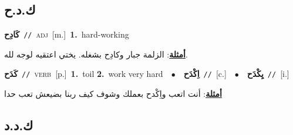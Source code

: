 \documentclass[10pt,a4paper,twoside]{article} %
\begin{document}
\begin{multicols}{2}
\vspace{-3mm}
\subsection*{\color{blue}\foreignlanguage{arabic}{ك.د.ح}\color{blue}{}} 

{\setlength\topsep{0pt}\textbf{\foreignlanguage{arabic}{كَادِح}}\ {\color{gray}\texttt{//}\color{black}}\ \textsc{adj}\ [m.]\ \textbf{1.}~hard-working\  \begin{flushright}\color{gray}\foreignlanguage{arabic}{\textbf{\underline{\foreignlanguage{arabic}{أمثلة}}}: الزلمة جبار وكادِح بشغله. يختي اعتقيه لوجه لله.}\end{flushright}\color{black}} \vspace{2mm}

{\setlength\topsep{0pt}\textbf{\foreignlanguage{arabic}{كَدَح}}\ {\color{gray}\texttt{//}\color{black}}\ \textsc{verb}\ [p.]\ \textbf{1.}~toil  \textbf{2.}~work very hard\ \ $\bullet$\ \ \setlength\topsep{0pt}\textbf{\foreignlanguage{arabic}{اِكْدَح}}\ {\color{gray}\texttt{//}\color{black}}\ [c.]\ \ $\bullet$\ \ \setlength\topsep{0pt}\textbf{\foreignlanguage{arabic}{يِكْدَح}}\ {\color{gray}\texttt{//}\color{black}}\ [i.]\  \begin{flushright}\color{gray}\foreignlanguage{arabic}{\textbf{\underline{\foreignlanguage{arabic}{أمثلة}}}: أنت اتعب واِكْدح بعملك وشوف كيف ربنا بضيعش تعب حدا}\end{flushright}\color{black}} \vspace{2mm}

\vspace{-3mm}
\subsection*{\color{blue}\foreignlanguage{arabic}{ك.د.د}\color{blue}{}} 


\end{multicols}
\end{document}
